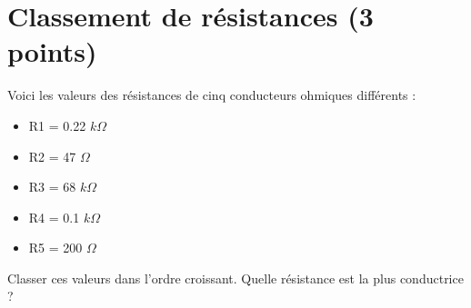 \section{Classement de résistances (3 points)}

Voici les valeurs des résistances de cinq conducteurs ohmiques différents :
\begin{multicols}{2}
	\begin{itemize}
	\item R1 = \num{0.22} $k\Omega$
	\item R2 = \num{47} $\Omega$
	\item R3 = \num{68} $k\Omega$
	\item R4 = \num{0.1} $k\Omega$
	\item R5 = \num{200} $\Omega$
\end{itemize}
\end{multicols}

\begin{questions}
	\question Classer ces valeurs dans l’ordre croissant.
	\question Quelle résistance est la plus conductrice ?
	 
\end{questions}